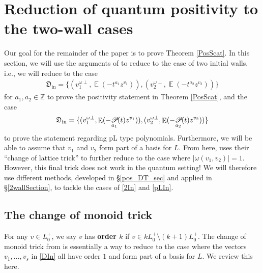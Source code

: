 \documentclass{amsart}
\DeclareMathOperator{\pl}{\mathscr{P}\!}
\DeclareMathOperator{\In}{in}
\DeclareMathOperator{\EE}{\mathbb{E}}
\def\!{\mskip-\thinmuskip}
\let\f=\mathfrak
\theoremstyle{plain}%
\theoremstyle{definition}
\theoremstyle{remark}
\begin{document}
\section{Reduction of quantum positivity to the two-wall cases}\label{PosSect}


Our goal for the remainder of the paper is to prove Theorem \ref{PosScat}.  In this section, we will use the arguments of \cite[\S C.3]{GHKK} to reduce to the case of two initial walls, i.e., we will reduce to the case
\begin{align}\label{2In}
    \f{D}_{\In}=\{(v_1^{\omega\perp},\EE(-t^{a_1}z^{v_1})), (v_2^{\omega\perp},\EE(-t^{a_2}z^{v_2}))\}
\end{align}
for $a_1,a_2\in\mathbb{Z}$ to prove the positivity statement in Theorem \ref{PosScat}, and the case
\begin{align}\label{pLIn}
    \f{D}_{\In}=\{(v_1^{\omega\perp},\EE(-\!\pl_{a_1}(t)z^{v_1})), (v_2^{\omega\perp},\EE(-\!\pl_{a_2}(t)z^{v_2}))\}
\end{align}
to prove the statement regarding pL type polynomials.  Furthermore, we will be able to assume that $v_1$ and $v_2$ form part of a basis for $L$.  From here, \cite{GHKK} uses their ``change of lattice trick'' to further reduce to the case where $|\omega(v_1,v_2)|=1$.  However, this final trick does not work in the quantum setting!  We will therefore use different methods, developed in \S \ref{pos_DT_sec} and applied in \S \ref{2wallSection}, to tackle the cases of \eqref{2In} and \eqref{pLIn}.



\subsection{The change of monoid trick}\label{MonoidTrick}


For any $v\in L_0^+$, we say $v$ has \textbf{order $k$} if $v\in kL_0^+\setminus (k+1)L_0^+$.  The change of monoid trick from \cite[\S C.3]{GHKK} is essentially a way to reduce to the case where the vectors $v_1,\ldots,v_s$ in \eqref{DIn} all have order $1$ and form part of a basis for $L$.  We review this here.
 
\end{document}
